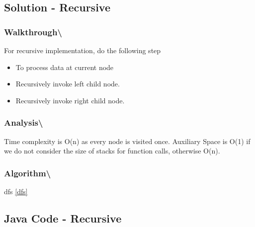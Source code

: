 \documentclass[]{book}
\providecommand{\tightlist}{%
  \setlength{\itemsep}{0pt}\setlength{\parskip}{0pt}}
\begin{document}
\hypertarget{solution---recursive-1}{%
\subsection{Solution - Recursive}\label{solution---recursive-1}}

\hypertarget{walkthrough-68}{%
\subsubsection{Walkthrough\textbackslash{}}\label{walkthrough-68}}

For recursive implementation, do the following step

\begin{itemize}
\tightlist
\item
  To process data at current node
\item
  Recursively invoke left child node.
\item
  Recursively invoke right child node.
\end{itemize}

\hypertarget{analysis-75}{%
\subsubsection{Analysis\textbackslash{}}\label{analysis-75}}

Time complexity is O(n) as every node is visited once. Auxiliary Space is O(1) if we do not consider the size of stacks
for function calls, otherwise O(n).

\hypertarget{algorithm-76}{%
\subsubsection{Algorithm\textbackslash{}}\label{algorithm-76}}

dfs \ref{dfs}

\hypertarget{java-code---recursive-1}{%
\subsection{Java Code - Recursive}\label{java-code---recursive-1}}
\end{document}
